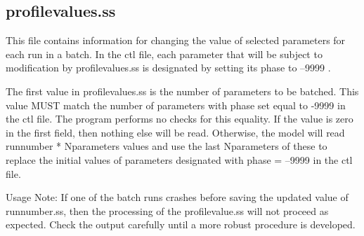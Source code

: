 \subsection{profilevalues.ss}	
This file contains information for changing the value of selected parameters for each run in a batch.  In the ctl file, each parameter that will be subject to modification by profilevalues.ss is designated by setting its phase to --9999 .

The first value in profilevalues.ss is the number of parameters to be batched.  This value MUST match the number of parameters with phase set equal to -9999 in the ctl file.  The program performs no checks for this equality.  If the value is zero in the first field, then nothing else will be read.  Otherwise, the model will read runnumber * Nparameters values and use the last Nparameters of these to replace the initial values of parameters designated with phase = --9999 in the ctl file.

Usage Note:  If one of the batch runs crashes before saving the updated value of runnumber.ss, then the processing of the profilevalue.ss will not proceed as expected.  Check the output carefully until a more robust procedure is developed.


